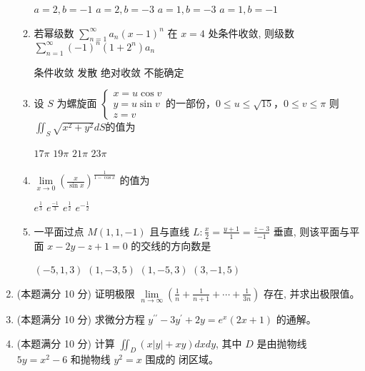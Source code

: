 \begin{enumerate}
\begin{enumerate}
\fourchoices
{$a=2, b=-1$}
{$a=2, b=-3$}
{$a=1, b=-3$}
{$a=1, b=-1$}

\item 
若幂级数 $\sum\limits_{n=1}^{\infty} a_{n}(x-1)^{n}$ 在 $x=4$ 处条件收敛, 则级数 $\sum\limits_{n=1}^{\infty}(-1)^{n}\left(1+2^{n}\right) a_{n}$  


\fourchoices
{条件收敛}
{发散}
{绝对收敛}
{不能确定}

\item 
设 $S$ 为螺旋面 $\left\{\begin{array}{l}x=u \cos v \\ y=u \sin v   \\ z=v\end{array} \right.$的一部份，$ 0\leq u \leq \sqrt{15} $，$ 0 \leq v \leq \pi $ 则 $\iint_{S} \sqrt{x^{2}+y^{2}} d S$的值为  


\fourchoices
{$17 \pi$}
{$19 \pi$}
{$21 \pi$}
{$23 \pi$}

\item 
$\lim\limits _{x \rightarrow 0}\left(\frac{x}{\sin x}\right)^{\frac{1}{1-\cos x}}$ 的值为  


\fourchoices
{$e^{\frac{1}{3}}$}
{$e^{\frac{-1}{3}}$}
{$e^{\frac{1}{2}}$}
{$e^{-\frac{1}{2}}$}


\item 
一平面过点 $M(1,1,-1)$ 且与直线 $L: \frac{x}{2}=\frac{y+1}{1}=\frac{z-3}{-1}$ 垂直, 则该平面与平 面 $x-2 y-z+1=0$ 的交线的方向数是  


\fourchoices
{$(-5,1,3)$}
{$(1,-3,5)$}
{$(1,-5,3)$}
{$(3,-1,5)$}


		
		
	\end{enumerate}




\item 
(本题满分 10 分)	
证明极限 $\lim\limits _{n \rightarrow \infty}\left(\frac{1}{n}+\frac{1}{n+1}+\cdots+\frac{1}{3 n}\right)$ 存在, 并求出极限值。



\item 
(本题满分 10 分)	
求微分方程 $y^{\prime \prime}-3 y^{\prime}+2 y=e^{x}(2 x+1)$ 的通解。




\item 
(本题满分 10 分)	
计算 $\iint_{D}(x|y|+x y) d x d y$, 其中 $D$ 是由抛物线 $5 y=x^{2}-6$ 和抛物线 $y^{2}=x$ 围成的 闭区域。



\end{enumerate}
